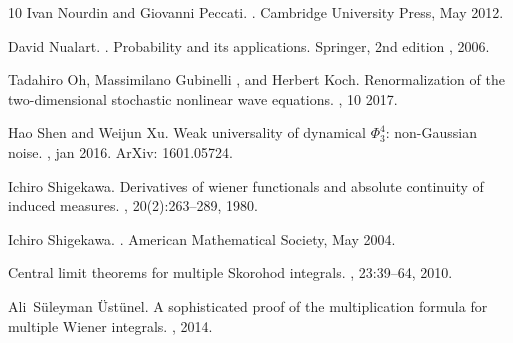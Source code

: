 \begin{thebibliography}{10}
  Ivan Nourdin  and  Giovanni
  Peccati.{\newblock} .{\newblock} Cambridge University Press,
  May 2012.{\newblock}
  
  David Nualart.{\newblock} .{\newblock} Probability and its applications.
  Springer, 2nd  edition , 2006.{\newblock}
  
  Tadahiro Oh, Massimilano
  Gubinelli , and  Herbert Koch.{\newblock} Renormalization of the
  two-dimensional stochastic nonlinear wave equations.{\newblock}
  , 10
  2017.{\newblock}
  
  Hao Shen  and  Weijun Xu.{\newblock} Weak
  universality of dynamical $\Phi^4_3$: non-Gaussian noise.{\newblock}
  , jan 2016.{\newblock} ArXiv:
  1601.05724.{\newblock}
  
  Ichiro Shigekawa.{\newblock}
  Derivatives of wiener functionals and absolute continuity of induced
  measures.{\newblock} , 20(2):263--289,
  1980.{\newblock}
  
  Ichiro Shigekawa.{\newblock}
  .{\newblock} American Mathematical Society,
  May 2004.{\newblock}
  
  Central limit theorems for multiple
  Skorohod integrals.{\newblock} , 23:39--64,
  2010.{\newblock}
  
  Ali~S{\"u}leyman
  {\"U}st{\"u}nel.{\newblock} A sophisticated proof of the multiplication
  formula for multiple Wiener integrals.{\newblock} , 2014.{\newblock}
\end{thebibliography}

\

\


